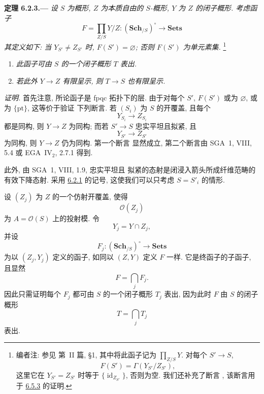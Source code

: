 
\medskip
{}\label{thm:sga3-VIB-6.2.3}%
\noindent\textbf{定理 6.2.3.---}
\emph{设 \(S\) 为概形, \(Z\) 为本质自由的 \(S\)-概形,
\(Y\) 为 \(Z\) 的闭子概形.
考虑函子}
\[
  F=\prod_{Z/S}Y/Z:
  (\mathbf{Sch}_{/S})^\circ\longrightarrow\mathbf{Sets}
\]
\emph{其定义如下: 当 \(Y_{S'}\ne Z_{S'}\) 时,
\(F(S')=\varnothing\); 否则 \(F(S')\) 为单元素集.}%
\footnote{\label{note:sga3-VIB-55}编者注: 参见
第~II 篇, \S1, 其中将此函子记为
\(\prod_{Z/S}Y\). 对每个 \(S'\to S\),
\[
  F(S')=\Gamma(Y_{S'}/Z_{S'}),
\]
这里它在 \(Y_{S'}=Z_{S'}\) 时等于
\(\{\operatorname{id}_{Z_{S'}}\}\), 否则为空.
我们还补充了断言 \textup{},
该断言用于 \hyperref[cor:sga3-VIB-6.5.3]{6.5.3} 的证明.}
\begin{enumerate}
\item[\textup{\SGAInlineRefTarget{thm:sga3-VIB-6.2.3:item:i}(i)}]\label{concl:sga3-VIB-6.2.3-i}
  \emph{此函子可由 \(S\) 的一个闭子概形
  \(T\) 表出.}
\item[\textup{(ii)}]\label{concl:sga3-VIB-6.2.3-ii}
  \emph{若此外 \(Y\to Z\) 有限呈示,
  则 \(T\to S\) 也有限呈示.}
\end{enumerate}

\emph{证明.}
首先注意, 所论函子是 fpqc 拓扑下的层.
由于对每个 \(S'\), \(F(S')\) 或为 \(\varnothing\), 或为
\(\{\mathrm{pt}\}\), 这等价于验证
下列断言. 若 \((S_i)\) 为 \(S\) 的开覆盖,
且每个
\[
  Y_{S_i}\longrightarrow Z_{S_i}
\]
都是同构, 则 \(Y\to Z\) 为同构; 而若
\(S'\to S\) 忠实平坦且拟紧, 且
\[
  Y_{S'}\longrightarrow Z_{S'}
\]
为同构, 则 \(Y\to Z\) 仍为同构. 第一个断言
显然成立, 第二个断言由 SGA~1,
VIII, 5.4 或 EGA~IV\(_2\), 2.7.1 得到.

此外, 由 SGA~1, VIII, 1.9, 忠实平坦且
拟紧的态射是闭浸入箭头所成纤维范畴的
有效下降态射.
采用 \hyperref[def:sga3-VIB-6.2.1]{6.2.1} 的记号,
这使我们可以只考虑 \(S=S'_i\) 的情形.

设 \((Z_j)\) 为 \(Z\) 的一个仿射开覆盖,
使得
\[
  \mathcal O(Z_j)
\]
为 \(A=\mathcal O(S)\) 上的投射模. 令
\[
  Y_j=Y\cap Z_j,
\]
并设
\[
  F_j:(\mathbf{Sch}_{/S})^\circ\longrightarrow\mathbf{Sets}
\]
为以 \((Z_j,Y_j)\) 定义的函子, 如同以
\((Z,Y)\) 定义 \(F\) 一样. 它是终函子的子函子,
且显然
\[
  F=\bigcap_j F_j.
\]
因此只需证明每个 \(F_j\) 都可由
\(S\) 的一个闭子概形 \(T_j\) 表出, 因为此时
\(F\) 由 \(S\) 的闭子概形
\[
  T=\bigcap_j T_j
\]
表出.

